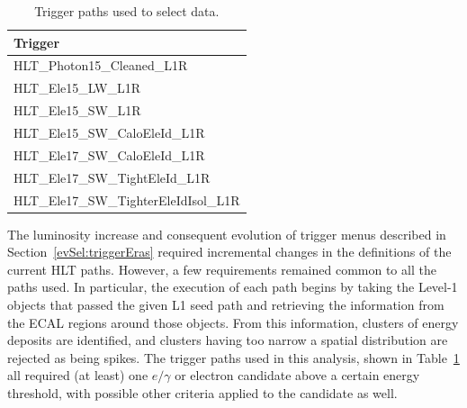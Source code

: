 \begin{table}[htbp]
  \begin{center}
    \caption{Trigger paths used to select data.}
    \label{TableTriggerPaths}
    \begin{tabular}[]{ | l | }
      \hline
      Trigger  \\ \hline \hline
      HLT\_Photon15\_Cleaned\_L1R  \\ \hline
      HLT\_Ele15\_LW\_L1R  \\ \hline
      HLT\_Ele15\_SW\_L1R  \\ \hline
      HLT\_Ele15\_SW\_CaloEleId\_L1R  \\ \hline
      HLT\_Ele17\_SW\_CaloEleId\_L1R  \\ \hline
      HLT\_Ele17\_SW\_TightEleId\_L1R  \\ \hline
      HLT\_Ele17\_SW\_TighterEleIdIsol\_L1R  \\ \hline
    \end{tabular}
  \end{center}
\end{table}



The luminosity increase and consequent evolution of trigger menus 
described in Section~\ref{evSel:triggerEras} required incremental changes 
in the definitions of the current HLT paths.  
However, a few requirements remained common to all the paths used.  
In particular, the execution of each path begins by taking 
the Level-1 objects that passed the given L1 seed path 
and retrieving the information from the ECAL regions %
around those objects.  
From this information, 
clusters of energy deposits are identified, 
and clusters having too narrow a spatial distribution are 
rejected as being spikes.  
The trigger paths used in this analysis, shown in Table~\ref{TableTriggerPaths} 
all required (at least) one 
$e/\gamma$ or electron candidate above a certain energy threshold, 
with possible other criteria applied to the candidate as well.%

